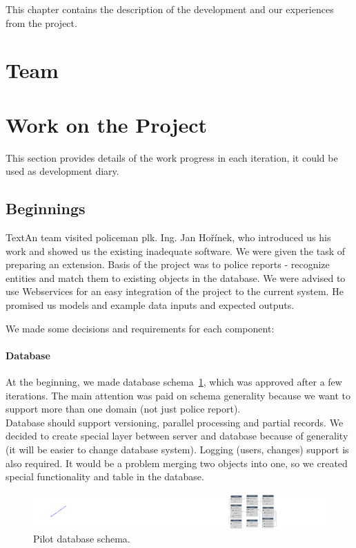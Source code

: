 This chapter contains the description of the development and our experiences from
the project.

\section{Team}

\section{Work on the Project}

This section provides details of the work progress in each iteration, it could be
used as development diary.

\subsection{Beginnings}
TextAn team visited policeman plk. Ing. Jan Hořínek, who introduced us his work and showed
us the existing inadequate software. We were given the task of preparing an extension.
Basis of the project was to police reports - recognize entities and match them
to existing objects in the database. We were advised to use Webservices for
an easy integration of the project to the current system. He promised us models
and example data inputs and expected outputs. 

We made some decisions and requirements for each component:

\paragraph{Database}
At the beginning, we made database schema~\ref{fig:dbpilot}, which was approved  after a few
iterations. The main attention was paid on schema generality because we want to
support more than one domain (not just police report).\\
Database should support versioning, parallel processing and partial records. We
decided to create special layer between server and database because of
generality (it will be easier to change database system). Logging (users,
changes) support is also required. It would be a problem merging two objects into 
one, so we created special functionality and table in the
database.
\begin{figure}[!htb]
        \centering
        \includegraphics[width=\textwidth]{Images/db-pilot}
        \caption{Pilot database schema.}
        \label{fig:dbpilot}
\end{figure}

